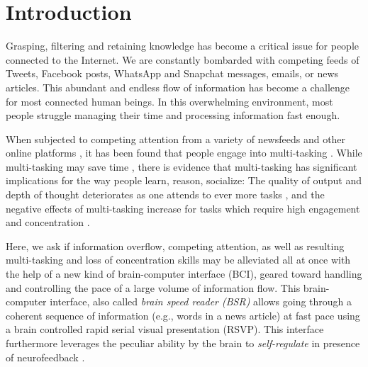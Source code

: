\section{Introduction}
\label{intro}
Grasping, filtering and retaining knowledge has become a critical issue for people connected to the Internet. We are constantly bombarded with competing feeds of Tweets, Facebook posts, WhatsApp and Snapchat messages, emails, or news articles. This abundant and endless flow of information has become a challenge for most connected human beings. In this overwhelming environment, most people struggle managing their time \cite{maillart2011} and processing information fast enough. 

When subjected to competing attention \cite{hansen2001competing} from a variety of newsfeeds and other online platforms \cite{foehr2006media,harris2016}, it has been found that people engage into multi-tasking \cite{wallis2006multitasking}. While multi-tasking may save time \cite{roberts2005generation}, there is evidence that multi-tasking has significant implications for the way people learn, reason, socialize: The quality of output and depth of thought deteriorates as one attends to ever more tasks \cite{hembrooke2003laptop}, and the negative effects of multi-tasking increase for tasks which require high engagement and concentration \cite{wallis2006multitasking,burgess2000strategy}.

Here, we ask if information overflow, competing attention, as well as resulting multi-tasking and loss of concentration skills may be alleviated all at once with the help of a new kind of brain-computer interface (BCI), geared toward handling and controlling the pace of a large volume of information flow. This brain-computer interface, also called {\it brain speed reader (BSR)}  allows going through a coherent sequence of information (e.g., words in a news article) at fast pace using a brain controlled rapid serial visual presentation (RSVP). This interface furthermore leverages the peculiar ability by the brain to {\it self-regulate} in presence of neurofeedback \cite{lubar1976eeg,weiskopf2004self}.

